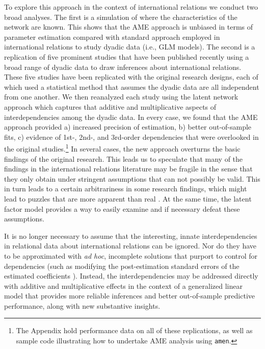 To explore this approach in the context of international relations we conduct two broad analyses. The first is a simulation of where the characteristics of the network are known. This shows that the AME approach is unbiased in terms of parameter estimation compared with standard approach employed in
international relations to study dyadic data (i.e., GLM models). The second is a replication of five prominent studies that have been published recently using a broad range of dyadic data to draw inferences about international relations.  These five studies have been replicated with the original research designs, each of which used a statistical method that assumes the dyadic data are all independent from one another.  We then reanalyzed each study using the latent network approach which captures that additive and multiplicative aspects of interdependencies among the dyadic data.  In every case, we found that the AME approach provided a) increased precision of estimation, b) better out-of-sample fits, c) evidence of 1st-, 2nd-, and 3rd-order dependencies that were overlooked in the original studies.\footnote{The Appendix hold performance data on all of these replications, as well as sample code illustrating how to undertake AME analysis using \texttt{amen}.} In several cases, the new approach overturns the basic findings of the original research.  This leads us to speculate that many of the findings in the international relations literature may be fragile in the sense that they only obtain under stringent assumptions that can not possibly be valid.  This in turn leads to a certain arbitrariness in some research findings, which might lead to puzzles that are more apparent than real \citep{zinnes:1980}.  At the same time, the latent factor model provides a way to easily examine and if necessary defeat these assumptions.

It is no longer necessary to assume that the interesting, innate interdependencies in relational data about international relations can be ignored. Nor do they have to be approximated with \textit{ad hoc}, incomplete solutions that purport to control for dependencies (such as modifying the post-estimation standard errors of the estimated coefficients \citep{king:roberts:2014}). Instead, the interdependencies may be addressed directly with additive and multiplicative effects in the context of a generalized linear model that provides more reliable inferences and better out-of-sample predictive performance, along with new substantive insights. 